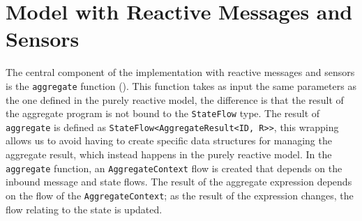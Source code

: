 

\section{Model with Reactive Messages and Sensors}
\label{section:mrms}

The central component of the implementation with reactive messages and sensors is the \texttt{aggregate} function (). This function takes as input the same parameters as the one defined in the purely reactive model, the difference is that the result of the aggregate program is not bound to the \texttt{StateFlow} type. The result of \texttt{aggregate} is defined as \texttt{StateFlow<AggregateResult<ID, R>>}, this wrapping allows us to avoid having to create specific data structures for managing the aggregate result, which instead happens in the purely reactive model. In the \texttt{aggregate} function, an \texttt{AggregateContext} flow is created that depends on the inbound message and state flows. The result of the aggregate expression depends on the flow of the \texttt{AggregateContext}; as the result of the expression changes, the flow relating to the state is updated.


